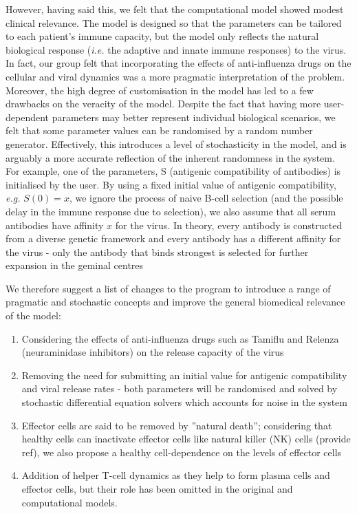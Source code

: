 \documentclass[a4paper, 12pt]{report}
\begin{document}

However, having said this, we felt that the computational model showed modest clinical relevance. The model is designed so that the parameters can be tailored to each patient's immune capacity, but the model only reflects the natural biological response (\emph{i.e.} the adaptive and innate immune responses) to the virus. In fact, our group felt that incorporating the effects of anti-influenza drugs on the cellular and viral dynamics was a more pragmatic interpretation of the problem. \\

Moreover, the high degree of customisation in the model has led to a few drawbacks on the veracity of the model. Despite the fact that having more user-dependent parameters may better represent individual biological scenarios, we felt that some parameter values can be randomised by a random number generator. Effectively, this introduces a level of stochasticity in the model, and is arguably a more accurate reflection of the inherent randomness in the system. \\

For example, one of the parameters, S (antigenic compatibility of antibodies) is initialised by the user. By using a fixed initial value of antigenic compatibility, \emph{e.g.} $S(0) = x$, we ignore the process of naive B-cell selection (and the possible delay in the immune response due to selection), we also assume that all serum antibodies have affinity $x$ for the virus. In theory, every antibody is constructed from a diverse genetic framework and every antibody has a different affinity for the virus - only the antibody that binds strongest is selected for further expansion in the geminal centres %

We therefore suggest a list of changes to the program to introduce a range of pragmatic and stochastic concepts and improve the general biomedical relevance of the model:
\begin{enumerate}
\item Considering the effects of anti-influenza drugs such as Tamiflu and Relenza (neuraminidase inhibitors) on the release capacity of the virus
\item Removing the need for submitting an initial value for antigenic compatibility and viral release rates - both parameters will be randomised and solved by stochastic differential equation solvers which accounts for noise in the system
\item Effector cells are said to be removed by ''natural death''; considering that healthy cells can inactivate effector cells like natural killer (NK) cells (provide ref), we also propose a healthy cell-dependence on the levels of effector cells
\item Addition of helper T-cell dynamics as they help to form plasma cells and effector cells, but their role has been omitted in the original and computational models.
\end{enumerate}
\end{document}
